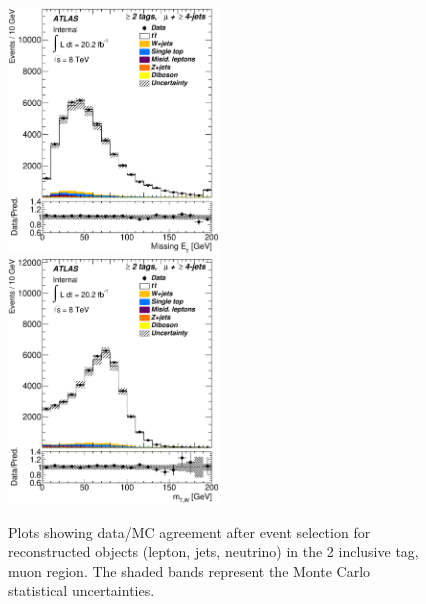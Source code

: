 \begin{figure}[!hb]
\begin{center}
		\includegraphics[height=65mm]{chapters/whel/figures/control_Plots2/bTag_2incl/MissingEt_mu}
        \includegraphics[height=65mm]{chapters/whel/figures/control_Plots2/bTag_2incl/TransverseMass_mu}
	\caption{Plots showing data/MC agreement after event selection for reconstructed objects (lepton, jets, neutrino) in the 2 inclusive \bt tag, muon region. The shaded bands represent the Monte Carlo statistical uncertainties.}
	\label{fig:control_plots_mu_2incl}
	\end{center}
	\end{figure}

